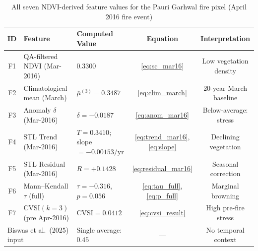\documentclass[12pt, a4paper]{article}
\begin{document}
\begin{table}[H]
\centering
\caption{All seven NDVI-derived feature values for the
         Pauri Garhwal fire pixel (April 2016 fire event)}
\label{tab:full_summary}
\small
\begin{tabular}{@{}cllcc@{}}
\toprule
\textbf{ID} & \textbf{Feature} & \textbf{Computed Value} &
\textbf{Equation} & \textbf{Interpretation} \\
\midrule
F1 & QA-filtered NDVI (Mar-2016)
   & $0.3300$
   & \eqref{eq:sc_mar16}
   & Low vegetation density \\
F2 & Climatological mean (March)
   & $\bar{\mu}^{(3)} = 0.3487$
   & \eqref{eq:clim_march}
   & 20-year March baseline \\
F3 & Anomaly $\delta$ (Mar-2016)
   & $\delta = -0.0187$
   & \eqref{eq:anom_mar16}
   & Below-average: stress \\
F4 & STL Trend (Mar-2016)
   & $T = 0.3410$; slope $= -0.00153$/yr
   & \eqref{eq:trend_mar16}, \eqref{eq:slope}
   & Declining vegetation \\
F5 & STL Residual (Mar-2016)
   & $R = +0.1428$
   & \eqref{eq:residual_mar16}
   & Seasonal correction \\
F6 & Mann--Kendall $\tau$ (full)
   & $\tau = -0.316$, $p = 0.056$
   & \eqref{eq:tau_full}, \eqref{eq:p_full}
   & Marginal browning \\
F7 & CVSI$(k=3)$ (pre Apr-2016)
   & $\mathrm{CVSI} = 0.0412$
   & \eqref{eq:cvsi_result}
   & High pre-fire stress \\
\midrule
\multicolumn{2}{l}{Biswas et al.\ (2025) input}
   & Single average: $0.45$
   & ---
   & No temporal context \\
\bottomrule
\end{tabular}
\end{table}
\end{document}
